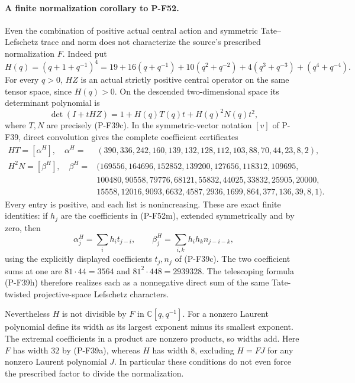 \paragraph{A finite normalization corollary to P-F52.}
Even the combination of positive actual central action and symmetric
Tate--Lefschetz trace and norm does not characterize the source's
prescribed normalization $F$. Indeed put
\[
       H(q)=(q+1+q^{-1})^4
        =19+16(q+q^{-1})+10(q^2+q^{-2})
                    +4(q^3+q^{-3})+(q^4+q^{-4}).               \tag{P-F52m}
\]
For every $q>0$, $HZ$ is an actual strictly positive central
operator on the same tensor space, since $H(q)>0$.
On the descended two-dimensional space its determinant polynomial is
\[
             \det(I+tHZ)=1+H(q)T(q)t+H(q)^2N(q)t^2,             \tag{P-F52n}
\]
where $T,N$ are precisely (P-F39c).
In the symmetric-vector notation $[v]$ of P-F39, direct convolution
gives the complete coefficient certificates
\[
 \begin{split}
 HT=[\alpha^H],\quad
 \alpha^H={}&(390,336,242,160,139,132,128,112,103,88,70,44,23,8,2),\\
 H^2N=[\beta^H],\quad
 \beta^H={}&(169556,164696,152852,139200,127656,118312,109695,\\
 &100480,90558,79776,68121,55832,44025,33832,25905,20000,\\
 &15558,12016,9093,6632,4587,2936,1699,864,377,136,39,8,1).
 \end{split}                                                    \tag{P-F52o}
\]
Every entry is positive, and each list is nonincreasing.
These are exact finite identities: if $h_j$ are the coefficients
in (P-F52m), extended symmetrically and by zero, then
\[
 \alpha_j^H=\sum_i h_i t_{j-i},\qquad
 \beta_j^H=\sum_{i,k}h_ih_kn_{j-i-k},                           \tag{P-F52p}
\]
using the explicitly displayed coefficients $t_j,n_j$ of (P-F39c).
The two coefficient sums at one are $81\cdot44=3564$ and
$81^2\cdot448=2939328$. The telescoping formula (P-F39h)
therefore realizes each as a nonnegative direct sum of the same
Tate-twisted projective-space Lefschetz characters.

Nevertheless $H$ is not divisible by $F$ in
$\mathbb C[q,q^{-1}]$. For a nonzero Laurent polynomial define
its width as its largest exponent minus its smallest exponent.
The extremal coefficients in a product are nonzero products,
so widths add. Here $F$ has width $32$ by (P-F39a), whereas
$H$ has width $8$, excluding $H=FJ$ for any nonzero Laurent
polynomial $J$. In particular these conditions do not even
force the prescribed factor to divide the normalization.

